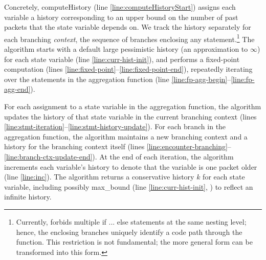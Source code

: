Concretely, {\sc computeHistory} (line \ref{line:computeHistoryStart}) assigns each
variable a history corresponding to an upper bound on the number of past
packets that the state variable depends on. We track the history separately for
each branching {\em context}, \ie the sequence of branches enclosing any
statement.\footnote{Currently, \TheSystem forbids multiple {\ctfoot if ...
else} statements at the same nesting level; hence, the enclosing branches
uniquely identify a code path through the function. This restriction is not
fundamental; the more general form can be transformed into this form.} The
algorithm starts with a default large pessimistic history (\ie an approximation
to $\infty$) for each state variable (line \ref{line:curr-hist-init}), and
performs a fixed-point computation (lines
\ref{line:fixed-point}--\ref{line:fixed-point-end}), repeatedly iterating over
the statements in the aggregation function (line
\ref{line:fp-agg-begin}--\ref{line:fp-agg-end}).

For each assignment to a state variable in the aggregation function, the
algorithm updates the history of that state variable in the current branching
context (lines \ref{line:stmt-iteration}--\ref{line:stmt-history-update}). For
each branch in the aggregation function, the algorithm maintains a new
branching context and a history for the branching context itself (lines
\ref{line:encounter-branching}--\ref{line:branch-ctx-update-end}).  At the end
of each iteration, the algorithm increments each variable's history to denote
that the variable is one packet older (line \ref{line:inc}).  The algorithm
returns a conservative history $k$ for each state variable, including possibly
max\_bound (line \ref{line:curr-hist-init}, ) to reflect an
infinite history.

